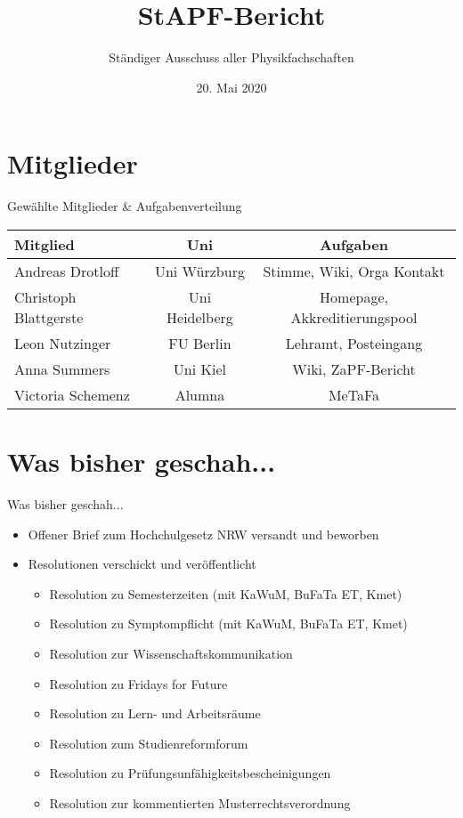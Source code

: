 \documentclass[compress, aspectratio=169]{beamer}
\title[StAPf-Bericht]{StAPF-Bericht}
\author{Ständiger Ausschuss aller Physikfachschaften}
\institute[Zusammenkunft aller Physikfachschaften]
\date{20. Mai 2020}
\begin{document}
\begin{frame}[plain]{}
  \titlepage
\end{frame}

\section{Mitglieder}

\begin{frame}{Gewählte Mitglieder \& Aufgabenverteilung}
  \begin{tabular}{lcc}
    Mitglied & Uni & Aufgaben \\ \hline
    Andreas Drotloff & Uni Würzburg & Stimme, Wiki, Orga Kontakt \\
    Christoph Blattgerste & Uni Heidelberg & Homepage, Akkreditierungspool \\
    Leon Nutzinger & FU Berlin & Lehramt, Posteingang \\
    Anna Summers & Uni Kiel & Wiki, ZaPF-Bericht \\
    Victoria Schemenz & Alumna & MeTaFa
  \end{tabular}
\end{frame}

\section{Was bisher geschah...}

\begin{frame}{Was bisher geschah...}
  \begin{itemize}
    \item Offener Brief zum Hochchulgesetz NRW versandt und beworben
    \item Resolutionen verschickt und veröffentlicht
    \begin{itemize}
        \item Resolution zu Semesterzeiten (mit KaWuM, BuFaTa ET, Kmet)
        \item Resolution zu Symptompflicht (mit KaWuM, BuFaTa ET, Kmet)
        \item Resolution zur Wissenschaftskommunikation
        \item Resolution zu Fridays for Future
        \item Resolution zu Lern- und Arbeitsräume
        \item Resolution zum Studienreformforum
        \item Resolution zu Prüfungsunfähigkeitsbescheinigungen
        \item Resolution zur kommentierten Musterrechtsverordnung
    \end{itemize}
  \end{itemize}
\end{frame}
\end{document}
